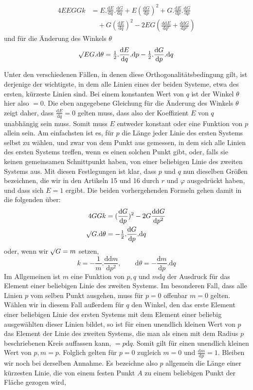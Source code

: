 %
\[
\begin{aligned}
4EEGGk&=E\mathord{.}\frac{\mathrm{d}E}{\mathrm{d}q}\mathord{.}\frac{\mathrm{d}G}{\mathrm{d}q}+E(\frac{\mathrm{d}G}{\mathrm{d}p})^2+G\mathord{.}\frac{\mathrm{d}E}{\mathrm{d}p}\mathord{.}\frac{\mathrm{d}G}{\mathrm{d}p}\\
&\quad+G(\frac{\mathrm{d}E}{\mathrm{d}q})^2-2EG(\frac{\mathrm{d}\mathrm{d}E}{\mathrm{d}q^2}+\frac{\mathrm{d}\mathrm{d}G}{\mathrm{d}p^2})
\end{aligned}
\]
und für die Änderung des Winkels \(\theta\)
\[
\mathord{{}^{}\!\surd}EG\mathord{.}\mathrm{d}\theta=\tfrac{1}{2}\mathord{.}\frac{\mathrm{d}E}{\mathrm{d}q}\mathord{.}\mathrm{d}p-\tfrac{1}{2}\mathord{.}\frac{\mathrm{d}G}{\mathrm{d}p}\mathord{.}\mathrm{d}q
\]
\par\indent Unter den verschiedenen Fällen, in denen diese Orthogonalitätsbedingung gilt, ist derjenige der wichtigste, in dem alle Linien eines der beiden Systeme, etwa des ersten, kürzeste Linien sind. Bei einem konstanten Wert von \(q\) ist der Winkel \(\theta\) hier also \(=0\). Die eben angegebene Gleichung für die Änderung des Winkels \(\theta\) zeigt daher, dass \(\frac{\mathrm{d}E}{\mathrm{d}q}=0\) gelten muss, dass also der Koeffizient \(E\) von \(q\) unabhängig sein muss. Somit muss \(E\) entweder konstant oder eine Funktion von \(p\) allein sein. Am einfachsten ist es, für \(p\) die Länge jeder Linie des ersten Systems selbst zu wählen, und zwar von dem Punkt aus gemessen, in dem sich alle Linien des ersten Systems treffen, wenn es einen solchen Punkt gibt, oder, falls sie keinen gemeinsamen Schnittpunkt haben, von einer beliebigen Linie des zweiten Systems aus. Mit diesen Festlegungen ist klar, dass \(p\) und \(q\) nun dieselben Größen bezeichnen, die wir in den Artikeln 15 und 16 durch \(r\) und \(\varphi\) ausgedrückt haben, und dass sich \(E=1\) ergibt. Die beiden vorhergehenden Formeln gehen damit in die folgenden über:
\[
\begin{aligned}
4GGk&=(\frac{\mathrm{d}G}{\mathrm{d}p})^2-2G\frac{\mathrm{d}\mathrm{d}G}{\mathrm{d}p^2}\\
\mathord{{}^{}\!\surd}G\mathord{.}\mathrm{d}\theta&=-\tfrac{1}{2}\mathord{.}\frac{\mathrm{d}G}{\mathrm{d}p}\mathord{.}\mathrm{d}q
\end{aligned}
\]
oder, wenn wir \(\mathord{{}^{}\!\surd}G=m\) setzen,
\[
k=-\frac{1}{m}\mathord{.}\frac{\mathrm{d}\mathrm{d}m}{\mathrm{d}p^2},\qquad\mathrm{d}\theta=-\frac{\mathrm{d}m}{\mathrm{d}p}\mathord{.}\mathrm{d}q
\]
Im Allgemeinen ist \(m\) eine Funktion von \(p,q\) und \(m\mathrm{d}q\) der Ausdruck für das Element einer beliebigen Linie des zweiten Systems. Im besonderen Fall, dass alle Linien \(p\) vom selben Punkt ausgehen, muss für \(p=0\) offenbar \(m=0\) gelten. Wählen wir in diesem Fall außerdem für \(q\) den Winkel, den das erste Element einer beliebigen Linie des ersten Systems mit dem Element einer beliebig ausgewählten dieser Linien bildet, so ist für einen unendlich kleinen Wert von \(p\) das Element der Linie des zweiten Systems, die man als einen mit dem Radius \(p\) beschriebenen Kreis auffassen kann, \(=p\mathrm{d}q\). Somit gilt für einen unendlich kleinen Wert von \(p,m=p\). Folglich gelten für \(p=0\) zugleich \(m=0\) und \(\frac{\mathrm{d}m}{\mathrm{d}p}=1\).
Bleiben wir noch bei derselben Annahme. Es bezeichne also \(p\) allgemein die Länge einer kürzesten Linie, die von einem festen Punkt \(A\) zu einem beliebigen Punkt der Fläche gezogen wird,
